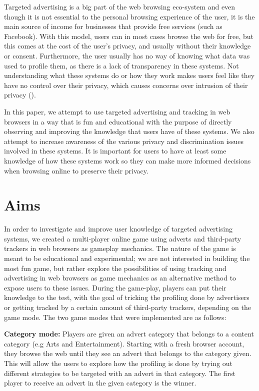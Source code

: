 \documentclass{l4proj}
\begin{document}
Targeted advertising is a big part of the web browsing eco-system and even though it is not essential to the personal browsing experience of the user, it is the main source of income for businesses that provide free services (such as Facebook). With this model, users can in most cases browse the web for free, but this comes at the cost of the user's privacy, and usually without their knowledge or consent. Furthermore, the user usually has no way of knowing what data was used to profile them, as there is a lack of transparency in these systems. Not understanding what these systems do or how they work makes users feel like they have no control over their privacy, which causes concerns over intrusion of their privacy (\cite{intro}). 

In this paper, we attempt to use targeted advertising and tracking in web browsers in a way that is fun and educational with the purpose of directly observing and improving the knowledge that users have of these systems. We also attempt to increase awareness of the various privacy and discrimination issues involved in these systems. It is important for users to have at least some knowledge of how these systems work so they can make more informed decisions when browsing online to preserve their privacy.

\section{Aims}
In order to investigate and improve user knowledge of targeted advertising systems, we created a multi-player online game using adverts and third-party trackers in web browsers as gameplay mechanics. The nature of the game is meant to be educational and experimental; we are not interested in building the most fun game, but rather explore the possibilities of using tracking and advertising in web browsers as game mechanics as an alternative method to expose users to these issues. During the game-play, players can put their knowledge to the test, with the goal of tricking the profiling done by advertisers or getting tracked by a certain amount of third-party trackers, depending on the game mode. The two game modes that were implemented are as follows:

\textbf{Category mode:} Players are given an advert category that belongs to a content category (e.g Arts and Entertainment). Starting with a fresh browser account, they browse the web until they see an advert that belongs to the category given. This will allow the users to explore how the profiling is done by trying out different strategies to be targeted with an advert in that category. The first player to receive an advert in the given category is the winner. 
\end{document}
